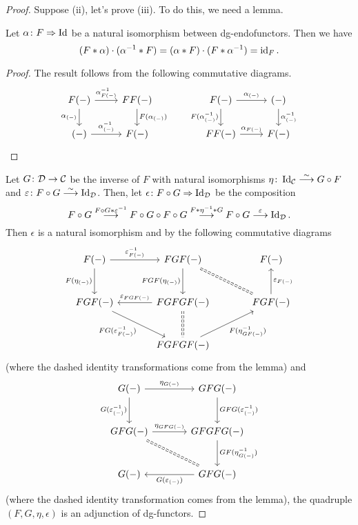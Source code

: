\begin{proof}
Suppose (ii), let's prove (iii). 
To do this, we need a lemma.
\begin{sublemma}
Let $\alpha\colon F\Rightarrow \operatorname{Id}$ be a natural isomorphism between 
dg-endofunctors. Then we have 
\[
(F\ast\alpha)\cdot(\alpha^{-1}\ast F)=
(\alpha\ast F)\cdot(F\ast\alpha^{-1})=\operatorname{id}_F.
\]
\end{sublemma}
\begin{proof}
The result follows from the following commutative diagrams.
\[
\begin{tikzcd}
{F(-)}\ar{d}[swap]{\alpha_{(-)}}
\ar{r}{\alpha^{-1}_{F(-)}}&
{FF(-)}\ar{d}{F(\alpha_{(-)})}\\
{(-)}\ar{r}{\alpha^{-1}_{(-)}}&{F(-)}
\end{tikzcd}
\qquad
\begin{tikzcd}
{F(-)}\ar{d}[swap]{F(\alpha^{-1}_{(-)})}
\ar{r}{\alpha_{(-)}}&
{(-)}\ar{d}{\alpha^{-1}_{(-)}}\\
{FF(-)}\ar{r}{\alpha_{F(-)}}&{F(-)}
\end{tikzcd}
\]
\end{proof}

Let $G\colon{\cal D}\to{\cal C}$ be the inverse of $F$ with natural isomorphisms 
$\eta\colon\operatorname{Id}_{{\cal C}}\overset{\sim}{\longrightarrow}{G\circ F}$ and 
$\varepsilon\colon{F\circ G}\overset{\sim}{\longrightarrow}\operatorname{Id}_{{\cal D}}$. 
Then, let $\epsilon\colon{F\circ G}\Rightarrow\operatorname{Id}_{{\cal D}}$ be the composition
\[
F\circ G\stackrel{{F\circ G\ast\varepsilon^{-1}}}{\longrightarrow}
F\circ G\circ F\circ G\stackrel{{F\ast\eta^{-1}\ast G}}{\longrightarrow}
F\circ G\stackrel{{\varepsilon}}{\longrightarrow}
\operatorname{Id}_{{\cal D}}.
\]
Then $\epsilon$ is a natural isomorphism and by 
the following commutative diagrams
\[
\begin{tikzcd}[column sep=large,row sep=large]
F(-)\ar{d}[swap]{F(\eta_{(-)})}\ar{r}{\varepsilon^{-1}_{F(-)}}&
FGF(-)\ar{d}[swap]{FGF(\eta_{(-)})}\ar[dr,dashed,equal]&
F(-)\\
FGF(-)\ar{dr}[swap]{FG(\varepsilon^{-1}_{F(-)})}&
FGFGF(-)\ar{l}[swap]{\varepsilon_{FGF(-)}}\ar[d,dashed,equal]&
FGF(-)\ar{u}[swap]{\varepsilon_{F(-)}}\\&
FGFGF(-)\ar{ur}[swap]{F(\eta^{-1}_{GF(-)})}&
\end{tikzcd}
\]
(where the dashed identity transformations come from the lemma)
and
\[
\begin{tikzcd}[column sep=large,row sep=large]
G(-)\ar{r}{\eta_{G(-)}}\ar{d}[swap]{G(\varepsilon^{-1}_{(-)})} &
GFG(-)\ar{d}{GFG(\varepsilon^{-1}_{(-)})}\\
GFG(-)\ar{r}{\eta_{GFG(-)}}\ar[dr,dashed,equal]&
GFGFG(-)\ar{d}{GF(\eta^{-1}_{G(-)})}\\
G(-)&
GFG(-)\ar{l}{G(\varepsilon_{(-)})}
\end{tikzcd}
\]
(where the dashed identity transformation comes from the lemma), 
the quadruple $(F,G,\eta,\epsilon)$ is an adjunction of dg-functors.


\end{proof}
